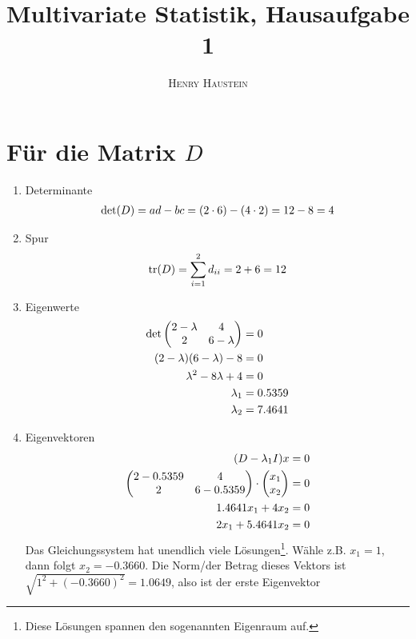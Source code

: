 \documentclass{article}
\title{\textbf{Multivariate Statistik, Hausaufgabe 1}}
\author{\textsc{Henry Haustein}}
\date{}
\DeclareMathOperator{\tr}{tr}
\begin{document}
	\maketitle
	
	\section*{Für die Matrix $D$}
	\begin{enumerate}[label=(\alph*)]
		\item Determinante
		\begin{align}
			\det(D) = ad-bc = (2\cdot 6) - (4\cdot 2) = 12 - 8 = 4 \notag
		\end{align}
		\item Spur
		\begin{align}
			\tr(D) = \sum_{i=1}^{2} d_{ii} = 2 + 6 = 12 \notag
		\end{align}
		\item Eigenwerte
		\begin{align}
			\det\begin{pmatrix}
				2-\lambda & 4 \\ 2 & 6-\lambda
			\end{pmatrix} &= 0 \notag \\
			(2-\lambda)(6-\lambda)-8 &= 0 \notag \\
			\lambda^2 - 8\lambda + 4 &= 0 \notag \\
			\lambda_1 &= 0.5359 \notag \\
			\lambda_2 &= 7.4641 \notag
		\end{align}
		\item Eigenvektoren
		\begin{align}
			(D-\lambda_1I)x &= 0 \notag \\
			\begin{pmatrix}
				2-0.5359 & 4 \\ 2 & 6-0.5359
			\end{pmatrix} \cdot \begin{pmatrix}
				x_1 \\ x_2
			\end{pmatrix} &= 0 \notag \\
			1.4641x_1+4x_2 &= 0 \notag \\
			2x_1+5.4641x_2 &= 0 \notag
		\end{align}
		Das Gleichungssystem hat unendlich viele Lösungen\footnote{Diese Lösungen spannen den sogenannten Eigenraum auf.}. Wähle z.B. $x_1=1$, dann folgt $x_2=-0.3660$. Die Norm/der Betrag dieses Vektors ist $\sqrt{1^2+(-0.3660)^2}=1.0649$, also ist der erste Eigenvektor

\end{enumerate}
\end{document}
